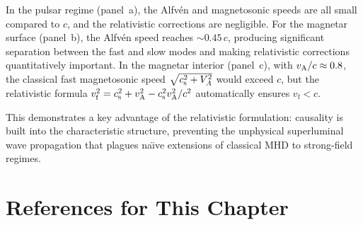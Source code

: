 In the pulsar regime (panel~a), the Alfv\'en and magnetosonic speeds are
all small compared to $c$, and the relativistic corrections are
negligible.  For the magnetar surface (panel~b), the Alfv\'en speed
reaches $\sim 0.45\,c$, producing significant separation between the
fast and slow modes and making relativistic corrections quantitatively
important.  In the magnetar interior (panel~c), with $v_{\mathrm{A}}/c \approx 0.8$,
the classical fast magnetosonic speed $\sqrt{c_{\mathrm{s}}^2 + V_A^2}$ would
exceed $c$, but the relativistic formula
$v_{\mathrm{f}}^2 = c_{\mathrm{s}}^2 + v_{\mathrm{A}}^2 - c_{\mathrm{s}}^2v_{\mathrm{A}}^2/c^2$
automatically ensures $v_{\mathrm{f}} < c$.

This demonstrates a key advantage of the relativistic formulation:
causality is built into the characteristic structure, preventing the
unphysical superluminal wave propagation that plagues na\"{\i}ve
extensions of classical MHD to strong-field regimes.

\section*{References for This Chapter}


